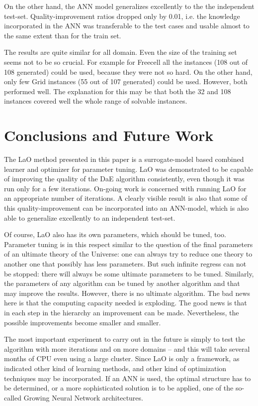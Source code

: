 \documentclass{MYsig-alternate}
\begin{document}
On the other hand, the ANN model generalizes excellently to the the independent test-set. Quality-improvement ratios dropped only by 0.01, i.e. the knowledge incorporated in the ANN was transferable to the test cases and usable almost to the same extent than for the train set.

The results are quite similar for all domain. Even the size of the training set seems not to be so crucial. For example for Freecell all the instances (108 out of 108 generated) could be used, because they were not so hard. On the other hand, only few  Grid instances (55 out of 107 generated) could be used. However, both performed well. The explanation for this may be that both the 32 and 108 instances covered well the whole range of solvable instances.

\section{Conclusions and Future Work}
\label{section:conclusions}
\label{section:futurework}	

The LaO method presented in this paper is a surrogate-model based combined learner and optimizer for parameter tuning. LaO was demonstrated to be capable of improving the quality of the DaE algorithm consistently, even though it was run only for a few iterations. On-going work is concerned with running LaO for an appropriate number of iterations. A clearly visible result is also that some of this quality-improvement can be incorporated into an ANN-model, which is also able to generalize excellently to an independent test-set.


Of course, LaO also has its own parameters, which should be tuned, too. Parameter tuning is in this respect similar to the question of the final parameters of an ultimate theory of the Universe: one can always try to reduce one theory to another one that possibly has less parameters. But such infinite regress can not be stopped: there will always be some ultimate parameters to be tuned. Similarly, the parameters of any algorithm can be tuned by another algorithm and that may improve the results. However, there is no ultimate algorithm. The bad news here is that the computing capacity needed is exploding. The good news is that in each step in the hierarchy an improvement can be made. Nevertheless, the possible improvements become smaller and smaller.


The most important experiment to carry out in the future is simply to test the algorithm with more iterations and on more domains -- and this will take several months of CPU even using a large cluster. Since LaO is only a framework, as indicated other kind of learning methods, and other kind of optimization techniques may be incorporated. If an ANN is used, the optimal structure has to be determined, or a more sophisticated solution is to be applied, one of the so-called Growing Neural Network architectures.
\end{document}
